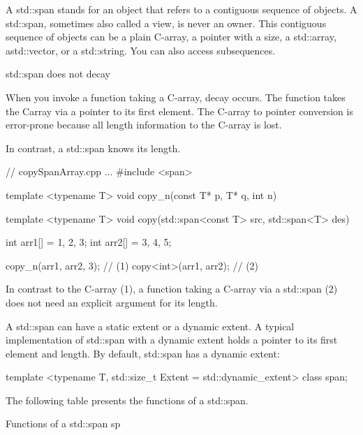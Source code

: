 A std::span stands for an object that refers to a contiguous sequence of objects. A std::span, sometimes also called a view, is never an owner. This contiguous sequence of objects can be a plain C-array, a pointer with a size, a std::array, astd::vector, or a std::string. You can also access subsequences.

\begin{myTip}{std::span does not decay}
	
When you invoke a function taking a C-array, decay occurs. The function takes the Carray via a pointer to its first element. The C-array to pointer conversion is error-prone because all length information to the C-array is lost.

In contrast, a std::span knows its length.

\begin{cpp}
// copySpanArray.cpp
...
#include <span>

template <typename T>
void copy_n(const T* p, T* q, int n){}

template <typename T>
void copy(std::span<const T> src, std::span<T> des){}

int arr1[] = {1, 2, 3};
int arr2[] = {3, 4, 5};

copy_n(arr1, arr2, 3); // (1)
copy<int>(arr1, arr2); // (2)
\end{cpp}

In contrast to the C-array (1), a function taking a C-array via a std::span (2) does not need an explicit argument for its length.
\end{myTip}

A std::span can have a static extent or a dynamic extent. A typical implementation of std::span with a dynamic extent holds a pointer to its first element and length. By default, std::span has a dynamic extent:


\begin{cpp}
template <typename T, std::size_t Extent = std::dynamic_extent>
class span;
\end{cpp}

The following table presents the functions of a std::span.

\begin{center}
Functions of a std::span sp
\end{center}

